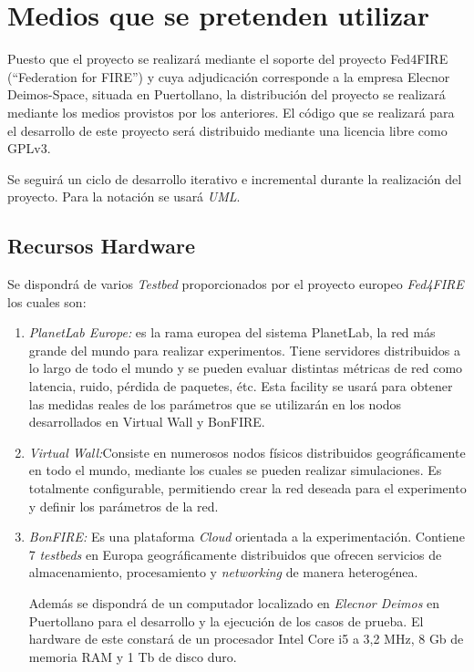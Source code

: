 
\section{Medios que se pretenden utilizar}
\label{sec:medios}

Puesto que el proyecto se realizará mediante el soporte del proyecto Fed4FIRE (``Federation for FIRE'') y cuya adjudicación corresponde a la empresa Elecnor Deimos-Space, situada en Puertollano, la distribución del proyecto se realizará mediante los medios provistos por los anteriores.
El código que se realizará para el desarrollo de este proyecto será distribuido mediante una licencia libre como GPLv3\cite{GPLv3}.

Se seguirá un ciclo de desarrollo iterativo e incremental durante la realización del proyecto.
Para la notación se usará \emph{UML}\cite{UML}.

\subsection{Recursos Hardware}
\label{sec:hardware}
Se dispondrá de varios \emph{Testbed} proporcionados por el proyecto europeo \emph{Fed4FIRE} los cuales son:
\begin{enumerate}
\item \emph{PlanetLab Europe\cite{PLE}:} es la rama europea del sistema PlanetLab, la red más grande del mundo para realizar experimentos. Tiene servidores distribuidos a lo largo de todo el mundo y se pueden evaluar distintas métricas de red como latencia, ruido, pérdida de paquetes, étc. Esta facility se usará para obtener las medidas reales de los parámetros que se utilizarán en los nodos desarrollados en Virtual Wall y BonFIRE.

\item \emph{Virtual Wall\cite{VW}:}Consiste en numerosos nodos físicos distribuidos geográficamente en todo el mundo, mediante los cuales se pueden realizar simulaciones. Es totalmente configurable, permitiendo crear la red deseada para el experimento y definir los parámetros de la red.
\item \emph{BonFIRE\cite{BF}:} Es una plataforma \emph{Cloud} orientada a la experimentación. Contiene 7 \emph{testbeds} en Europa geográficamente distribuidos que ofrecen servicios de almacenamiento, procesamiento y \emph{networking} de manera heterogénea.

Además se dispondrá de un computador localizado en \emph{Elecnor Deimos} en Puertollano para el desarrollo y la ejecución de los casos de prueba. El hardware de este constará de un procesador Intel Core i5 a 3,2 MHz, 8 Gb de memoria RAM y 1 Tb de disco duro.

\end{enumerate}

